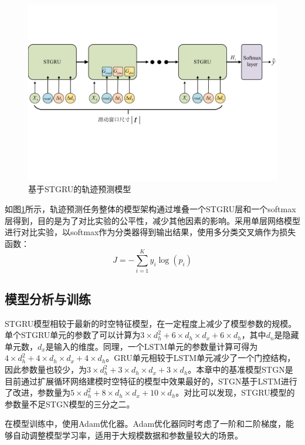 \documentclass[master]{thesis-uestc}
\begin{document}
\begin{figure}[!ht]
\centering
\includegraphics[width=1.0\linewidth]{./pic/stgru_all_4.pdf}
\caption{基于STGRU的轨迹预测模型}
\label{Figure.3.1}
\end{figure}

如图\ref{Figure.3.1}所示，轨迹预测任务整体的模型架构通过堆叠一个STGRU层和一个softmax层得到，目的是为了对比实验的公平性，减少其他因素的影响。采用单层网络模型进行对比实验，以softmax作为分类器得到输出结果，使用多分类交叉熵作为损失函数：
\begin{equation}
J = -\sum_{i=1}^{K}y_i\log (p_i)
\end{equation}

\subsection{模型分析与训练}
STGRU模型相较于最新的时空特征模型，在一定程度上减少了模型参数的规模。单个STGRU单元的参数了可以计算为$3 \times d_h^2+6 \times d_h \times d_x+6 \times d_h$，其中$d_n$是隐藏单元数，$d_x$是输入的维度。同理，一个LSTM单元的参数量计算可得为$4 \times d_h^2+4 \times d_h \times d_x+4 \times d_h$。GRU单元相较于LSTM单元减少了一个门控结构，因此参数量也较少，为$3 \times d_h^2+3 \times d_h \times d_x+3 \times d_h$。本章中的基准模型STGN是目前通过扩展循环网络建模时空特征的模型中效果最好的，STGN基于LSTM进行了改进，参数量为$5 \times d_h^2+8 \times d_h \times d_x+10 \times d_h$。对比可以发现，STGRU模型的参数量不足STGN模型的三分之二。

在模型训练中，使用Adam优化器。Adam优化器同时考虑了一阶和二阶梯度，能够自动调整模型学习率，适用于大规模数据和参数量较大的场景。
\end{document}
